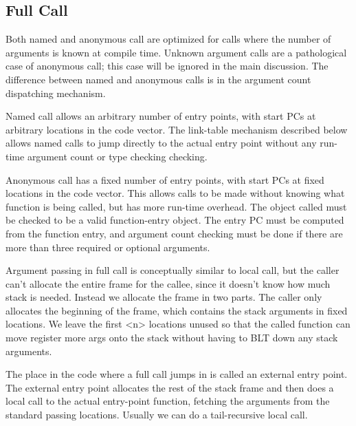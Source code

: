 {\begin{itemize, spread 0, spacing 1}

\subsection{Full Call}

Both named and anonymous call are optimized for calls where the number of
arguments is known at compile time.  Unknown argument calls are a
pathological case of anonymous call; this case will be ignored in the main
discussion.  The difference between named and anonymous calls is in the
argument count dispatching mechanism.

Named call allows an arbitrary number of entry points, with start PCs at
arbitrary locations in the code vector.  The link-table mechanism described
below allows named calls to jump directly to the actual entry point without any
run-time argument count or type checking checking.

Anonymous call has a fixed number of entry points, with start PCs at fixed
locations in the code vector.  This allows calls to be made without knowing
what function is being called, but has more run-time overhead.  The object
called must be checked to be a valid function-entry object.  The entry PC must
be computed from the function entry, and argument count checking must be done
if there are more than three required or optional arguments.

Argument passing in full call is conceptually similar to local call, but the
caller can't allocate the entire frame for the callee, since it doesn't know
how much stack is needed.  Instead we allocate the frame in two parts.  The
caller only allocates the beginning of the frame, which contains the stack
arguments in fixed locations.  We leave the first <n> locations unused so that
the called function can move register more args onto the stack without having
to BLT down any stack arguments.

The place in the code where a full call jumps in is called an external entry
point.  The external entry point allocates the rest of the stack frame and then
does a local call to the actual entry-point function, fetching the arguments
from the standard passing locations.  Usually we can do a tail-recursive local
call.  


\end{itemize, spread 0, spacing 1}}
